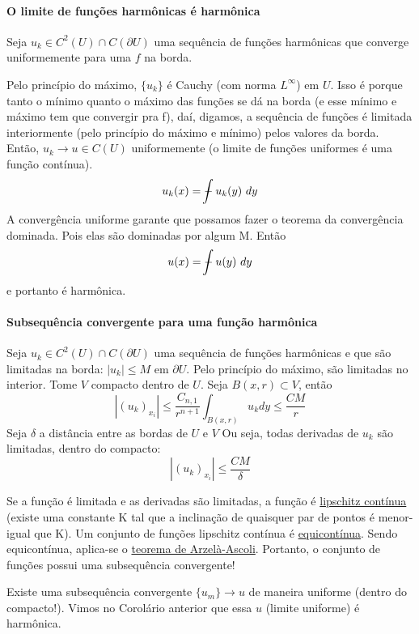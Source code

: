 \documentclass[11pt]{article}
\newcommand{\p}{\partial}
\def\Xint#1{\mathchoice
	{\XXint\displaystyle\textstyle{#1}}%
	{\XXint\textstyle\scriptstyle{#1}}%
	{\XXint\scriptstyle\scriptscriptstyle{#1}}%
	{\XXint\scriptscriptstyle\scriptscriptstyle{#1}}%
	\!\int}
\def\XXint#1#2#3{{\setbox0=\hbox{$#1{#2#3}{\int}$ }
		\vcenter{\hbox{$#2#3$ }}\kern-.6\wd0}}
\def\dashint{\Xint-}
\begin{document}
\paragraph{O limite de funções harmônicas é harmônica}

Seja \( u_k \in C^2(U) \cap C(\p U) \) uma sequência de funções harmônicas que converge uniformemente para uma \( f \) na borda. 

Pelo princípio do máximo, \( \{u_k\} \) é Cauchy (com norma \( L^\infty \)) em \( U \). Isso é porque tanto o mínimo quanto o máximo das funções se dá na borda (e esse mínimo e máximo tem que convergir pra f), daí, digamos, a sequência de funções é limitada interiormente (pelo princípio do máximo e mínimo) pelos valores da borda. Então, \( u_k \rightarrow u \in C(U) \) uniformemente (o limite de funções uniformes é uma função contínua). \[ u_k(x) = \dashint u_k(y)\ dy \] A convergência uniforme garante que possamos fazer o teorema da convergência dominada. Pois elas são dominadas por algum M. Então \[ u(x) = \dashint u(y)\ dy \] e portanto é harmônica.

\paragraph{Subsequência convergente para uma função harmônica}

Seja \( u_k \in C^2(U) \cap C(\p U) \) uma sequência de funções harmônicas e que são limitadas na borda: \( |u_k|\leq M  \) em \( \p U \). Pelo princípio do máximo, são limitadas no interior. Tome \( V \) compacto dentro de \( U \). Seja \( B(x,r)\subset V \), então \[  | (u_k)_{x_i} | \leq \frac{C_{n,1}}{r^{n+1}} \int_{B(x,r)} u_k dy \leq \frac{CM}{r}  \] Seja \( \delta \) a distância entre as bordas de \( U \) e \( V \)
Ou seja, todas derivadas de \( u_k \) são limitadas, dentro do compacto:
\[| (u_k)_{x_i} | \leq \frac{CM}{\delta} \]


Se a função é limitada e as derivadas são limitadas, a função é \href{https://en.wikipedia.org/wiki/Lipschitz_continuity}{lipschitz contínua} (existe uma constante K tal que a inclinação de quaisquer par de pontos é menor-igual que K). Um conjunto de funções lipschitz contínua é \href{https://en.wikipedia.org/wiki/Equicontinuity}{equicontínua}. Sendo equicontínua, aplica-se o \href{https://en.wikipedia.org/wiki/Arzel\%C3\%A0\%E2\%80\%93Ascoli_theorem}{teorema de Arzelà-Ascoli}. Portanto, o conjunto de funções possui uma subsequência convergente! 

Existe uma subsequência convergente \( \{ u_m \} \rightarrow u \) de maneira uniforme (dentro do compacto!). Vimos no Corolário anterior que essa \( u \) (limite uniforme) é harmônica.
\end{document}

